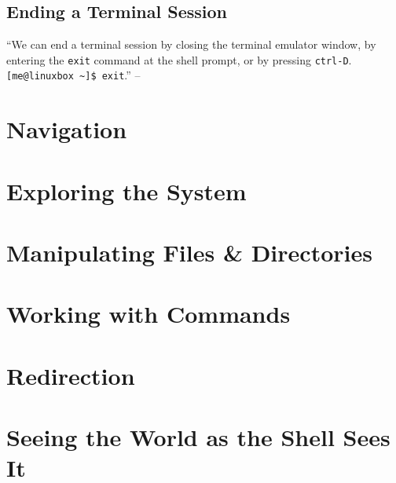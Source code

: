 \documentclass[oneside]{book}
\numberwithin{equation}{section}
\begin{document}
\subsection{Ending a Terminal Session}
``We can end a terminal session by closing the terminal emulator window, by entering the \texttt{exit} command at the shell prompt, or by pressing \texttt{ctrl-D}. \verb|[me@linuxbox ~]$ exit|.'' -- \cite[p. 42]{Shotts2019}


\section{Navigation}


\section{Exploring the System}


\section{Manipulating Files \& Directories}


\section{Working with Commands}


\section{Redirection}


\section{Seeing the World as the Shell Sees It}
\end{document}
